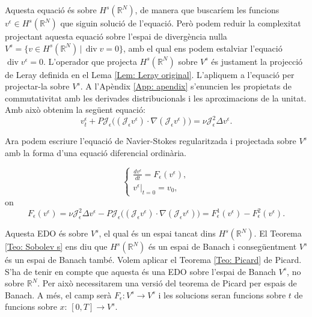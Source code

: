 \documentclass{article}
\numberwithin{equation}{section}
\DeclareMathOperator{\diver}{div}
\begin{document}
Aquesta equaci\'{o} \'{e}s sobre $H^s(\mathbb{R}^N)$, de manera que buscar\'{i}em les funcions $v^{\epsilon}\in H^s(\mathbb{R}^N)$ que siguin soluci\'{o} de l'equaci\'{o}. Per\`{o} podem reduir la complexitat projectant aquesta equaci\'{o} sobre l'espai de diverg\`{e}ncia nul\textperiodcentered la $V^s=\{v\in H^s(\mathbb{R}^N)\,|\,\diver v=0\}$, amb el qual ens podem estalviar l'equaci\'{o} $\diver v^{\epsilon}=0$. L'operador que projecta $H^s(\mathbb{R}^N)$ sobre $V^s$ \'{e}s justament la projecci\'{o} de Leray definida en el Lema \ref{Lem: Leray original}. L'apliquem a l'equaci\'{o} per projectar-la sobre $V^s$. A l'Ap\`{e}ndix \ref{App: apendix} s'enuncien les propietats de commutativitat amb les derivades distribucionals i les aproximacions de la unitat. Amb aix\`{o} obtenim la seg\"{u}ent equaci\'{o}:
\begin{equation}\label{Equ. Navier-Stokes projectada}
v_t^{\epsilon}+P\mathcal{J}_{\epsilon}\big((\mathcal{J}_{\epsilon}v^{\epsilon})\cdot\nabla(\mathcal{J}_{\epsilon}v^{\epsilon})\big)=\nu\mathcal{J}_{\epsilon}^2\Delta v^{\epsilon}.
\end{equation}

Ara podem escriure l'equaci\'{o} de Navier-Stokes regularitzada i projectada sobre $V^s$ amb la forma d'una equaci\'{o} diferencial ordin\`{a}ria.

\begin{equation}\label{Equ. EDO projectada}
\left\{\begin{array}{l}\displaystyle{\frac{dv^{\epsilon}}{dt}=F_{\epsilon}(v^{\epsilon})},\\v^{\epsilon}|_{t=0}=v_0,\end{array}\right.
\end{equation}
on
\begin{equation}
F_{\epsilon}(v^{\epsilon})=\nu\mathcal{J}_{\epsilon}^2\Delta v^{\epsilon}-P\mathcal{J}_{\epsilon}\big((\mathcal{J}_{\epsilon}v^{\epsilon})\cdot\nabla(\mathcal{J}_{\epsilon}v^{\epsilon})\big)=F_{\epsilon}^1(v^{\epsilon})-F_{\epsilon}^2(v^{\epsilon}).
\end{equation}

Aquesta EDO \'{e}s sobre $V^s$, el qual \'{e}s un espai tancat dins $H^s(\mathbb{R}^N)$. El Teorema \ref{Teo: Sobolev s} ens diu que $H^s(\mathbb{R}^N)$ \'{e}s un espai de Banach i conseg\"{u}entment $V^s$ \'{e}s un espai de Banach tamb\'{e}. Volem aplicar el Teorema \ref{Teo: Picard} de Picard. S'ha de tenir en compte que aquesta \'{e}s una EDO sobre l'espai de Banach $V^s$, no sobre $\mathbb{R}^N$. Per aix\`{o} necessitarem una versi\'{o} del teorema de Picard per espais de Banach. A m\'{e}s, el camp ser\`{a} $F_{\epsilon}:V^s\rightarrow V^s$ i les solucions seran funcions sobre $t$ de funcions sobre $x$: $[0,T]\rightarrow V^s$.
\end{document}
